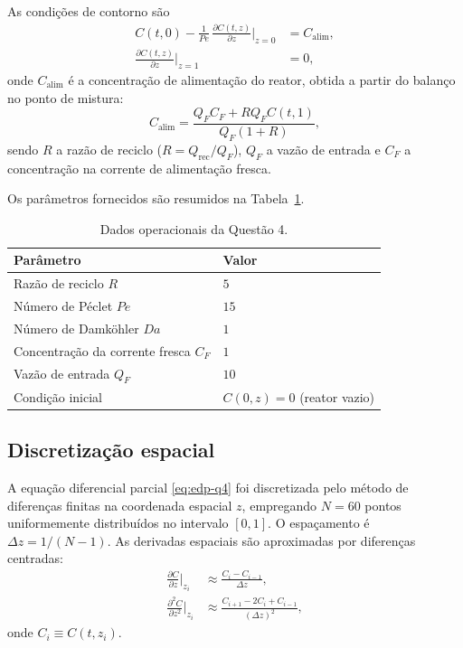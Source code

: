 \documentclass{article}
\begin{document}
As condições de contorno são
\begin{align}
  C(t,0) - \frac{1}{Pe}\,\frac{\partial C(t,z)}{\partial z}\bigg|_{z=0} &= C_{\text{alim}}, \label{eq:cc1-q4} \\
  \frac{\partial C(t,z)}{\partial z}\bigg|_{z=1} &= 0, \label{eq:cc2-q4}
\end{align}
onde $C_{\text{alim}}$ é a concentração de alimentação do reator, obtida a partir do balanço no ponto de mistura:
\begin{equation}
  C_{\text{alim}} = \frac{Q_F C_F + R Q_F C(t,1)}{Q_F (1 + R)}, \label{eq:calim-q4}
\end{equation}
sendo $R$ a razão de reciclo ($R = Q_{\text{rec}}/Q_F$), $Q_F$ a vazão de entrada e $C_F$ a concentração na corrente de alimentação fresca.

Os parâmetros fornecidos são resumidos na Tabela~\ref{tab:dados-q4}.

\begin{table}[ht]
  \centering
  \begin{tabular}{ll}
    \hline
    \textbf{Parâmetro} & \textbf{Valor} \\
    \hline
    Razão de reciclo $R$ & $5$ \\
    Número de Péclet $Pe$ & $15$ \\
    Número de Damköhler $Da$ & $1$ \\
    Concentração da corrente fresca $C_F$ & $1$ \\
    Vazão de entrada $Q_F$ & $10$ \\
    Condição inicial & $C(0,z) = 0$ (reator vazio) \\
    \hline
  \end{tabular}
  \caption{Dados operacionais da Questão 4.}
  \label{tab:dados-q4}
\end{table}

\subsection*{Discretização espacial}

A equação diferencial parcial \eqref{eq:edp-q4} foi discretizada pelo método de diferenças finitas na coordenada espacial $z$, empregando $N = 60$ pontos uniformemente distribuídos no intervalo $[0,1]$. O espaçamento é $\Delta z = 1/(N-1)$. As derivadas espaciais são aproximadas por diferenças centradas:
\begin{align}
  \frac{\partial C}{\partial z}\bigg|_{z_i} &\approx \frac{C_{i} - C_{i-1}}{\Delta z}, \label{eq:dz-q4} \\
  \frac{\partial^2 C}{\partial z^2}\bigg|_{z_i} &\approx \frac{C_{i+1} - 2C_i + C_{i-1}}{(\Delta z)^2}, \label{eq:d2z-q4}
\end{align}
onde $C_i \equiv C(t,z_i)$.
\end{document}
